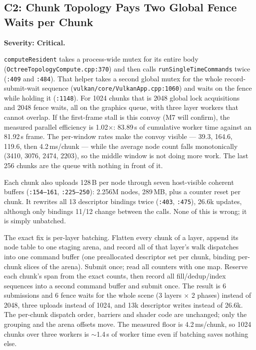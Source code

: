 \documentclass[11pt,a4paper]{article}
\begin{document}
\subsection{C2: Chunk Topology Pays Two Global Fence Waits per Chunk}
\label{sec:c2}

\textbf{Severity: Critical.}

\texttt{computeResident} takes a process-wide mutex for its entire body
(\texttt{OctreeTopologyCompute.cpp:370}) and then calls
\texttt{runSingleTimeCommands} twice (\texttt{:409} and \texttt{:484}). That
helper takes a second global mutex for the whole record-submit-wait sequence
(\texttt{vulkan/core/VulkanApp.cpp:1060}) and waits on the fence while
holding it (\texttt{:1148}). For 1024 chunks that is 2048 global lock
acquisitions and 2048 fence waits, all on the graphics queue, with three
layer workers that cannot overlap. If the first-frame stall is this convoy
(M7 will confirm), the measured parallel efficiency is 1.02$\times$: 83.89\,s
of cumulative worker time against an 81.92\,s frame. The per-window rates
make the convoy visible --- 39.3, 164.6, 119.6,
then 4.2\,ms/chunk --- while the average node count falls monotonically
(3410, 3076, 2474, 2203), so the middle window is not doing more work. The
last 256 chunks are the queue with nothing in front of it.

Each chunk also uploads 128\,B per node through seven host-visible coherent
buffers (\texttt{:154--161}, \texttt{:225--250}): 2.256M nodes, 289\,MB, plus
a counter reset per chunk. It rewrites all 13 descriptor bindings twice
(\texttt{:403}, \texttt{:475}), 26.6k updates, although only bindings 11/12
change between the calls. None of this is wrong; it is simply unbatched.

The exact fix is per-layer batching. Flatten every chunk of a layer, append
its node table to one staging arena, and record all of that layer's walk
dispatches into one command buffer (one preallocated descriptor set per
chunk, binding per-chunk slices of the arena). Submit once; read all counters
with one map. Reserve each chunk's span from the exact counts, then record
all fill/dedup/index sequences into a second command buffer and submit once.
The result is 6 submissions and 6 fence waits for the whole scene (3 layers
$\times$ 2 phases) instead of 2048, three uploads instead of 1024, and 13k
descriptor writes instead of 26.6k. The per-chunk dispatch order, barriers
and shader code are unchanged; only the grouping and the arena offsets move.
The measured floor is 4.2\,ms/chunk, so 1024 chunks over three workers is
$\sim$1.4\,s of worker time even if batching saves nothing else.
\end{document}
